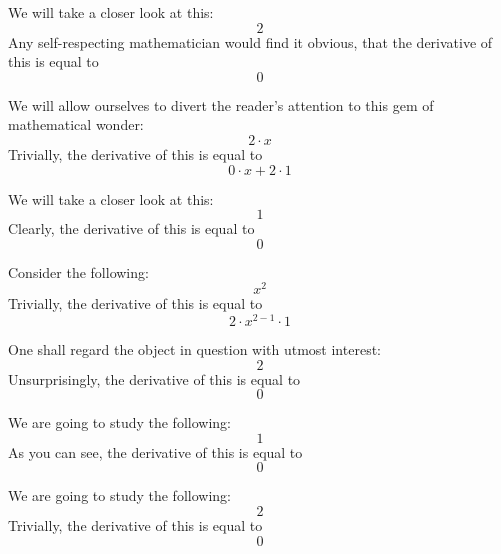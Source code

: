 \documentclass{article}
\begin{document}
We will take a closer look at this:
\begin{equation}
2 
\end{equation}
Any self-respecting mathematician would find it obvious, that the derivative of this is equal to
\begin{equation}
0 
\end{equation}

We will allow ourselves to divert the reader's attention to this gem of mathematical wonder:
\begin{equation}
2 \cdot x 
\end{equation}
Trivially, the derivative of this is equal to
\begin{equation}
0 \cdot x + 2 \cdot 1 
\end{equation}

We will take a closer look at this:
\begin{equation}
1 
\end{equation}
Clearly, the derivative of this is equal to
\begin{equation}
0 
\end{equation}

Consider the following:
\begin{equation}
x ^{2 } 
\end{equation}
Trivially, the derivative of this is equal to
\begin{equation}
2 \cdot x ^{2 - 1 } \cdot 1 
\end{equation}

One shall regard the object in question with utmost interest:
\begin{equation}
2 
\end{equation}
Unsurprisingly, the derivative of this is equal to
\begin{equation}
0 
\end{equation}

We are going to study the following:
\begin{equation}
1 
\end{equation}
As you can see, the derivative of this is equal to
\begin{equation}
0 
\end{equation}

We are going to study the following:
\begin{equation}
2 
\end{equation}
Trivially, the derivative of this is equal to
\begin{equation}
0 
\end{equation}
\end{document}
